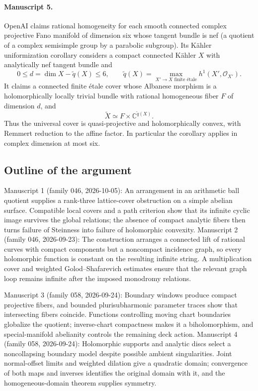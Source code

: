 \documentclass[11pt]{article}
\begin{document}
\paragraph{Manuscript 5.}
OpenAI claims rational homogeneity for each smooth connected complex projective Fano manifold of dimension six whose tangent bundle is nef (a quotient of a complex semisimple group by a parabolic subgroup).
Its Kähler uniformization corollary considers a compact connected Kähler $X$ with analytically nef tangent bundle and
\[
0\le d=\dim X-\widetilde q(X)\le6,\qquad
\widetilde q(X)=\max_{X'\to X\text{ finite étale}}h^1(X',\mathcal O_{X'}).
\]
It claims a connected finite étale cover whose Albanese morphism is a holomorphically locally trivial bundle with rational homogeneous fiber $F$ of dimension $d$, and
\[
\widetilde X\simeq F\times\mathbb C^{\widetilde q(X)}.
\]
Thus the universal cover is quasi-projective and holomorphically convex, with Remmert reduction to the affine factor. In particular the corollary applies in complex dimension at most six.

\subsection{Outline of the argument}
Manuscript 1 (family 046, 2026-10-05): An arrangement in an arithmetic ball quotient supplies a rank-three lattice-cover obstruction on a simple abelian surface. Compatible local covers and a path criterion show that its infinite cyclic image survives the global relations; the absence of compact analytic fibers then turns failure of Steinness into failure of holomorphic convexity. Manuscript 2 (family 046, 2026-09-23): The construction arranges a connected lift of rational curves with compact components but a noncompact incidence graph, so every holomorphic function is constant on the resulting infinite string. A multiplication cover and weighted Golod--Shafarevich estimates ensure that the relevant graph loop remains infinite after the imposed monodromy relations.

Manuscript 3 (family 058, 2026-09-24): Boundary windows produce compact projective fibers, and bounded plurisubharmonic parameter traces show that intersecting fibers coincide. Functions controlling moving chart boundaries globalize the quotient; inverse-chart compactness makes it a biholomorphism, and special-manifold abelianity controls the remaining deck action. Manuscript 4 (family 058, 2026-09-24): Holomorphic supports and analytic discs select a noncollapsing boundary model despite possible ambient singularities. Joint normal-offset limits and weighted dilation give a quadratic domain; convergence of both maps and inverses identifies the original domain with it, and the homogeneous-domain theorem supplies symmetry.
\end{document}
